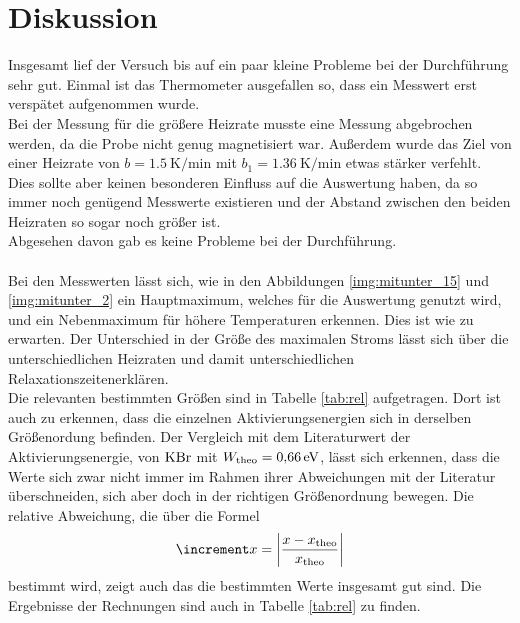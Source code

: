 \newpage
\section{Diskussion}

\noindent
Insgesamt lief der Versuch bis auf ein paar kleine Probleme bei der Durchführung sehr gut.
Einmal ist das Thermometer ausgefallen so, dass ein Messwert erst verspätet aufgenommen wurde.\\
Bei der Messung für die größere Heizrate musste eine Messung abgebrochen werden, da die Probe nicht genug magnetisiert war.
Außerdem wurde das Ziel von einer Heizrate von $b =\SI{1.5}{\kelvin\per\minute}$ mit $b_1 =\SI{1.36}{\kelvin\per\minute}$ etwas stärker verfehlt.
Dies sollte aber keinen besonderen Einfluss auf die Auswertung haben, da so immer noch genügend Messwerte existieren und der Abstand zwischen den beiden Heizraten so sogar noch größer ist.\\
Abgesehen davon gab es keine Probleme bei der Durchführung.\\\\

\noindent
Bei den Messwerten lässt sich, wie in den Abbildungen \ref{img:mitunter_15} und \ref{img:mitunter_2} ein Hauptmaximum, welches für die Auswertung genutzt wird, und ein Nebenmaximum für höhere Temperaturen erkennen.
Dies ist wie zu erwarten. Der Unterschied in der Größe des maximalen Stroms lässt sich über die unterschiedlichen Heizraten und damit unterschiedlichen Relaxationszeitenerklären.\\
Die relevanten bestimmten Größen sind in Tabelle \ref{tab:rel} aufgetragen. 
Dort ist auch zu erkennen, dass die einzelnen Aktivierungsenergien sich in derselben Größenordung befinden. 
Der Vergleich mit dem Literaturwert der Aktivierungsenergie, von $\ce{KBr}$ mit $W_{\text{theo}} = \SI{0.66}{\electronvolt}$\cite{lit}, 
lässt sich erkennen, dass die Werte sich zwar nicht immer im Rahmen ihrer Abweichungen mit der Literatur überschneiden, sich aber doch in der richtigen Größenordnung bewegen.
Die relative Abweichung, die über die Formel  
\begin{equation*}
    \increment x = \left| \frac{x - x_\t{theo}}{x_\t{theo}} \right|
\end{equation*}
bestimmt wird, zeigt auch das die bestimmten Werte insgesamt gut sind. Die Ergebnisse der Rechnungen sind auch in Tabelle \ref{tab:rel} zu finden.


